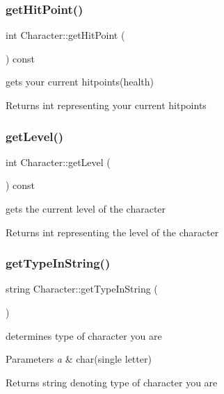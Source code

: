 \subsubsection{\texorpdfstring{get\+Hit\+Point()}{getHitPoint()}}
{\footnotesize\ttfamily int Character\+::get\+Hit\+Point (\begin{DoxyParamCaption}{ }\end{DoxyParamCaption}) const}

gets your current hitpoints(health) \begin{DoxyReturn}{Returns}
int representing your current hitpoints 
\end{DoxyReturn}
\hypertarget{class_character_a06713215a5850ec92194a1a711fb8cd7}{}\label{class_character_a06713215a5850ec92194a1a711fb8cd7} 
\subsubsection{\texorpdfstring{get\+Level()}{getLevel()}}
{\footnotesize\ttfamily int Character\+::get\+Level (\begin{DoxyParamCaption}{ }\end{DoxyParamCaption}) const}

gets the current level of the character \begin{DoxyReturn}{Returns}
int representing the level of the character 
\end{DoxyReturn}
\hypertarget{class_character_a935d99e0b3aa3a9a0055b35c1b4a357b}{}\label{class_character_a935d99e0b3aa3a9a0055b35c1b4a357b} 
\subsubsection{\texorpdfstring{get\+Type\+In\+String()}{getTypeInString()}}
{\footnotesize\ttfamily string Character\+::get\+Type\+In\+String (\begin{DoxyParamCaption}{ }\end{DoxyParamCaption})}

determines type of character you are 
\begin{DoxyParams}{Parameters}
{\em a} & char(single letter) \\
\hline
\end{DoxyParams}
\begin{DoxyReturn}{Returns}
string denoting type of character you are 
\end{DoxyReturn}
\hypertarget{class_character_a51e80d6194b8c0f4558b593c8e9b58f6}{}\label{class_character_a51e80d6194b8c0f4558b593c8e9b58f6} 

